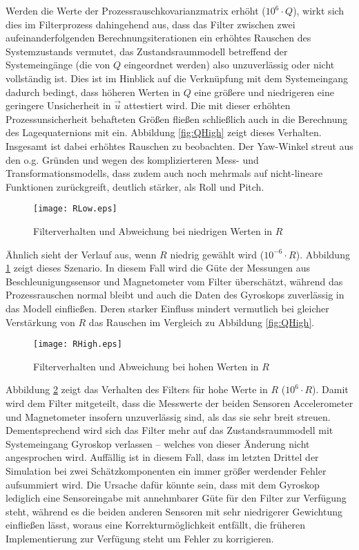 \documentclass[12pt,a4paper]{article}
\begin{document}
		Werden die Werte der Prozessrauschkovarianzmatrix erhöht ($10^{6}\cdot Q$), wirkt sich dies im Filterprozess dahingehend aus, dass das Filter zwischen zwei aufeinanderfolgenden Berechnungsiterationen ein erhöhtes Rauschen des Systemzustands vermutet, das Zustandsraummodell betreffend der Systemeingänge (die von $Q$ eingeordnet werden) also unzuverlässig oder nicht vollständig ist. Dies ist im Hinblick auf die Verknüpfung mit dem Systemeingang dadurch bedingt, dass höheren Werten in $Q$ eine größere und niedrigeren eine geringere Unsicherheit in $\vec{u}$ attestiert wird. Die mit dieser erhöhten Prozessunsicherheit behafteten Größen fließen schließlich auch in die Berechnung des Lagequaternions mit ein. Abbildung \ref{fig:QHigh} zeigt dieses Verhalten. Insgesamt ist dabei erhöhtes Rauschen zu beobachten. Der Yaw-Winkel streut aus den o.g. Gründen und wegen des komplizierteren Mess- und Transformationsmodells, dass zudem auch noch mehrmals auf nicht-lineare Funktionen zurückgreift, deutlich stärker, als Roll und Pitch.\\
		\begin{figure}[!ht]
			\hspace{-2cm}
			\texttt{[image: RLow.eps]}
			\caption{\label{fig:RLow}\centering Filterverhalten und Abweichung bei niedrigen Werten in $R$}
		\end{figure}
	
		Ähnlich sieht der Verlauf aus, wenn $R$ niedrig gewählt wird ($10^{-6}\cdot R$). Abbildung \ref{fig:RLow} zeigt dieses Szenario. In diesem Fall wird die Güte der Messungen aus Beschleunigungssensor und Magnetometer vom Filter überschätzt, während das Prozessrauschen normal bleibt und auch die Daten des Gyroskops zuverlässig in das Modell einfließen. Deren starker Einfluss mindert vermutlich bei gleicher Verstärkung von $R$ das Rauschen im Vergleich zu Abbildung \ref{fig:QHigh}.\\

		\begin{figure}[!ht]
			\hspace{-2cm}
			\texttt{[image: RHigh.eps]}
			\caption{\label{fig:RHigh}\centering Filterverhalten und Abweichung bei hohen Werten in $R$}
		\end{figure}
		Abbildung \ref{fig:RHigh} zeigt das Verhalten des Filters für hohe Werte in $R$ ($10^{6}\cdot R$). Damit wird dem Filter mitgeteilt, dass die Messwerte der beiden Sensoren Accelerometer und Magnetometer insofern unzuverlässig sind, als das sie sehr breit streuen. Dementsprechend wird sich das Filter mehr auf das Zustandsraummodell mit Systemeingang Gyroskop verlassen -- welches von dieser Änderung nicht angesprochen wird. Auffällig ist in diesem Fall, dass im letzten Drittel der Simulation bei zwei Schätzkomponenten ein immer größer werdender Fehler aufsummiert wird. Die Ursache dafür könnte sein, dass mit dem Gyroskop lediglich eine Sensoreingabe mit annehmbarer Güte für den Filter zur Verfügung steht, während es die beiden anderen Sensoren mit sehr niedrigerer Gewichtung einfließen lässt, woraus eine Korrekturmöglichkeit entfällt, die früheren Implementierung zur Verfügung steht um Fehler zu korrigieren.
\end{document}

